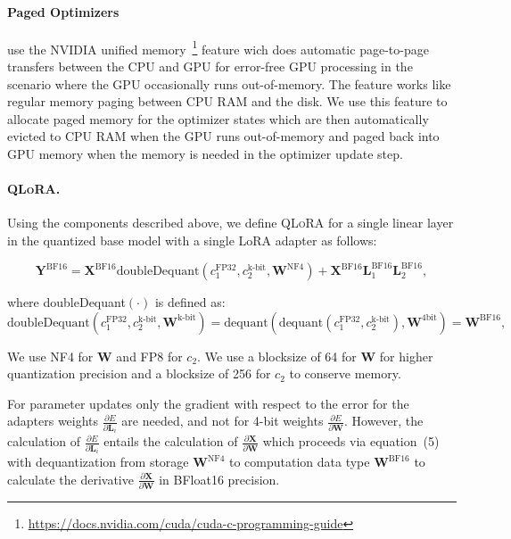 \documentclass{article}
\newcommand{\method}{\textsc{QLoRA}\xspace}
\newcommand{\Pagedoptim}{Paged Optimizers\xspace}
\begin{document}
\paragraph{\Pagedoptim} use the NVIDIA unified memory~\footnote{\tiny \url{https://docs.nvidia.com/cuda/cuda-c-programming-guide}} feature wich does automatic page-to-page transfers between the CPU and GPU for error-free GPU processing in the scenario where the GPU occasionally runs out-of-memory. The feature works like regular memory paging between CPU RAM and the disk. We use this feature to allocate paged memory for the optimizer states which are then automatically evicted to CPU RAM when the GPU runs out-of-memory and paged back into GPU memory when the memory is needed in the optimizer update step.

\paragraph{\method.} Using the components described above, we define \method for a single linear layer in the quantized base model with a single LoRA adapter as follows:

\begin{equation}
    \mathbf{Y}^{\text{BF16}} =  \mathbf{X}^{\text{BF16}} \text{doubleDequant}(c_1^{\text{FP32}}, c_2^{\text{k-bit}}, \mathbf{W}^{\text{NF4}}) + \mathbf{X}^{\text{BF16}}\mathbf{L}^{\text{BF16}}_1\mathbf{L}^{\text{BF16}}_2,
\end{equation}

\noindent
where doubleDequant$(\cdot)$ is defined as:
\begin{equation}
    \text{doubleDequant}(c_1^{\text{FP32}}, c_2^{\text{k-bit}}, \mathbf{W}^{\text{k-bit}}) = \text{dequant}(\text{dequant}(c_1^{\text{FP32}}, c_2^{\text{k-bit}}), \mathbf{W}^{\text{4bit}}) = \mathbf{W}^{\text{BF16}},
\end{equation}

We use NF4 for $\mathbf{W}$ and FP8 for $c_2$.
We use a blocksize of 64 for $\mathbf{W}$ for higher quantization precision and a blocksize of 256 for $c_2$ to conserve memory.

For parameter updates only the gradient with respect to the error for the adapters weights $\frac{\partial E}{\partial \mathbf{L}_i}$ are needed, and not for 4-bit weights $\frac{\partial E}{\partial \mathbf{W}}$. However, the calculation of $\frac{\partial E}{\partial \mathbf{L}_i}$ entails the calculation of $\frac{\partial \mathbf{X}}{\partial \mathbf{W}}$ which proceeds via equation~(5) with dequantization from storage $\mathbf{W}^{\text{NF4}}$ to computation data type $\mathbf{W}^{\text{BF16}}$ to calculate the derivative $\frac{\partial \mathbf{X}}{\partial \mathbf{W}}$ in BFloat16 precision.
\end{document}
